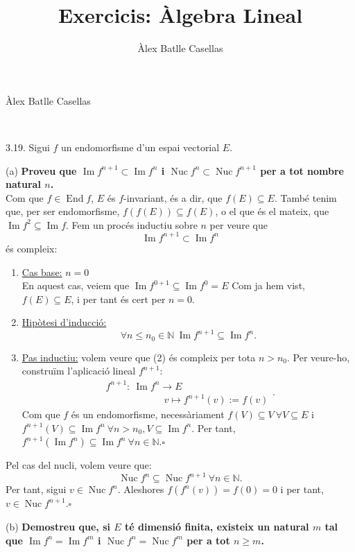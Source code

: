 \documentclass[11pt]{article}
\title{Exercicis: Àlgebra Lineal}
\author{Àlex Batlle Casellas}
\DeclareMathOperator{\nuc}{Nuc}
\DeclareMathOperator{\img}{Im}
\DeclareMathOperator{\End}{End}
\begin{document}
\begin{small}
Àlex Batlle Casellas
\end{small}\\

\begin{legal}
\item[3.19.] Sigui $f$ un endomorfisme d'un espai vectorial $E$.
	\item[(a) ]\textbf{Proveu que $\img{f^{n+1}}\subset\img{f^n}$ i $\nuc{f^n}\subset\nuc{f^{n+1}}$ per a tot nombre natural $n$.}\\
	Com que $f\in\End{f}$, $E$ és $f$-invariant, és a dir, que $f(E)\subseteq E$. També tenim que, per ser endomorfisme, $f(f(E))\subseteq f(E)$, o el que és el mateix, que $\img{f^2}\subseteq\img{f}$. Fem un procés inductiu sobre $n$ per veure que 
	\begin{equation}
		\img{f^{n+1}}\subset\img{f^n}
	\end{equation}
	és compleix:
	\begin{enumerate}
		\item \underline{Cas base:} $n=0$\\
		En aquest cas, veiem que $\img{f^{0+1}\subseteq\img{f^0}}=E$ Com ja hem vist, $f(E)\subseteq E$, i per tant és cert per $n=0$.
		\item \underline{Hipòtesi d'inducció:}
		\begin{equation}
			\forall n\leq n_0\in\mathbb{N}\ \img{f^{n+1}}\subseteq\img{f^n}.
		\end{equation}
		\item \underline{Pas inductiu:} volem veure que (2) és compleix per tota $n>n_0$. Per veure-ho, construïm l'aplicació lineal $f^{n+1}$:
		$$
		\begin{array}{lrr}
			f^{n+1}:\ \img{f^{n}}\longrightarrow E\\
			\qquad\qquad\qquad v\longmapsto f^{n+1}(v):=f(v)
		\end{array}.
		$$
		Com que $f$ és un endomorfisme, necessàriament $f(V)\subseteq V\ \forall V\subseteq E$ i $f^{n+1}(V)\subseteq\img{f^n}\ \forall n>n_0,V\subseteq\img{f^n}$. Per tant, $f^{n+1}(\img{f^n})\subseteq\img{f^n}\ \forall n\in\mathbb{N}$.$\square$\\
		\end{enumerate}
		Pel cas del nucli, volem veure que:
		$$
		\nuc{f^n}\subseteq\nuc{f^{n+1}}\ \forall n\in\mathbb{N}.
		$$
		Per tant, sigui $v\in\nuc{f^n}$. Aleshores $f(f^n(v))=f(0)=0$ i per tant, $v\in\nuc{f^{n+1}}$.$\square$
	\item[(b) ]\textbf{Demostreu que, si $E$ té dimensió finita, existeix un natural $m$ tal que $\img{f^n}=\img{f^m}$ i $\nuc{f^n}=\nuc{f^m}$ per a tot $n\geq m$.}\\

\end{legal}
\end{document}
